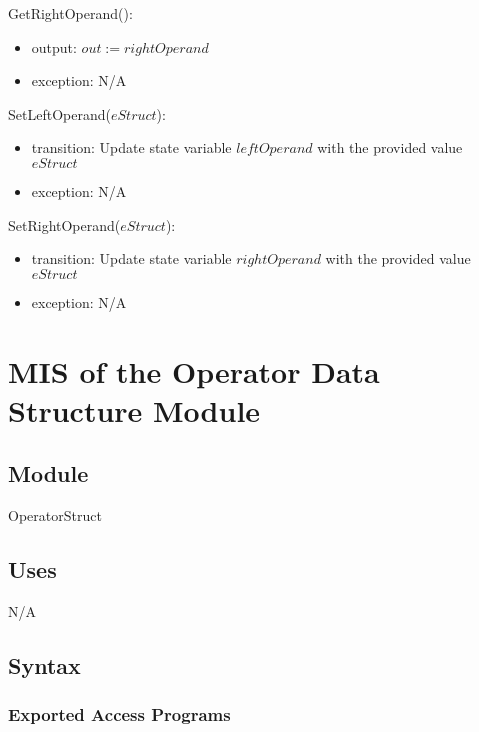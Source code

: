 \documentclass[12pt, titlepage]{article}
\begin{document}
\noindent GetRightOperand():
\begin{itemize}
	\item output: $out := rightOperand$
	\item exception: N/A
\end{itemize}

\noindent SetLeftOperand($eStruct$):
\begin{itemize}
	\item transition: Update state variable $leftOperand$ with the provided 
	value $eStruct$
	\item exception: N/A
\end{itemize}

\noindent SetRightOperand($eStruct$):
\begin{itemize}
	\item transition: Update state variable $rightOperand$ with the provided 
	value $eStruct$
	\item exception: N/A
\end{itemize}

\newpage

\section{MIS of the Operator Data Structure Module} 
\label{Module_operatordatastructure}


\subsection{Module}

OperatorStruct

\subsection{Uses}

N/A

\subsection{Syntax}

\subsubsection{Exported Access Programs}
\end{document}
